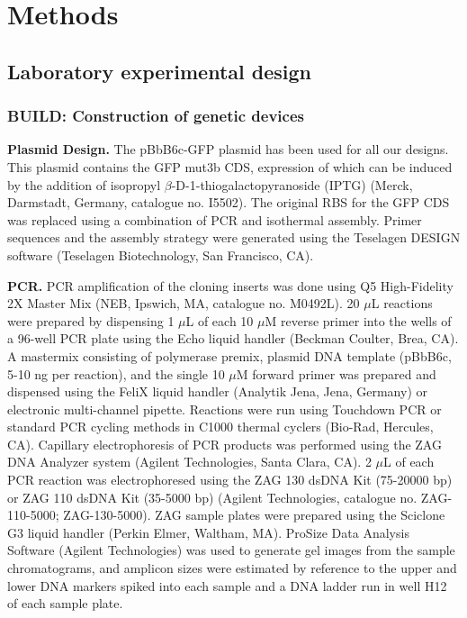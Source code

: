 \section{Methods}

\subsection{Laboratory experimental design}

\subsubsection{BUILD: Construction of genetic devices}

\textbf{Plasmid Design.}
The pBbB6c-GFP plasmid has been used for all our designs.
This plasmid contains the GFP mut3b CDS, expression of which can be induced by the addition of isopropyl $\beta$-D-1-thiogalactopyranoside (IPTG) (Merck, Darmstadt, Germany, catalogue no. I5502).
The original RBS for the GFP CDS was replaced using a combination of PCR and isothermal assembly.
Primer sequences and the assembly strategy were generated using the Teselagen DESIGN software (Teselagen Biotechnology, San Francisco, CA).

\textbf{PCR.}
PCR amplification of the cloning inserts was done using Q5 High-Fidelity 2X Master Mix (NEB, Ipswich, MA, catalogue no. M0492L).
20 $\mu$L reactions were prepared by dispensing 1 $\mu$L of each 10 $\mu$M reverse primer into the wells of a 96-well PCR plate using the Echo liquid handler (Beckman Coulter, Brea, CA).
A mastermix consisting of polymerase premix, plasmid DNA template (pBbB6c, 5-10 ng per reaction), and the single 10 $\mu$M forward primer was prepared and dispensed using the FeliX liquid handler (Analytik Jena, Jena, Germany) or electronic multi-channel pipette. Reactions were run using Touchdown PCR or standard PCR cycling methods in C1000 thermal cyclers (Bio-Rad, Hercules, CA).
Capillary electrophoresis of PCR products was performed using the ZAG DNA Analyzer system (Agilent Technologies, Santa Clara, CA).
2 $\mu$L of each PCR reaction was electrophoresed using the ZAG 130 dsDNA Kit (75-20000 bp) or ZAG 110 dsDNA Kit (35-5000 bp) (Agilent Technologies, catalogue no. ZAG-110-5000; ZAG-130-5000). ZAG sample plates were prepared using the Sciclone G3 liquid handler (Perkin Elmer, Waltham, MA).
ProSize Data Analysis Software (Agilent Technologies) was used to generate gel images from the sample chromatograms, and amplicon sizes were estimated by reference to the upper and lower DNA markers spiked into each sample and a DNA ladder run in well H12 of each sample plate. 


